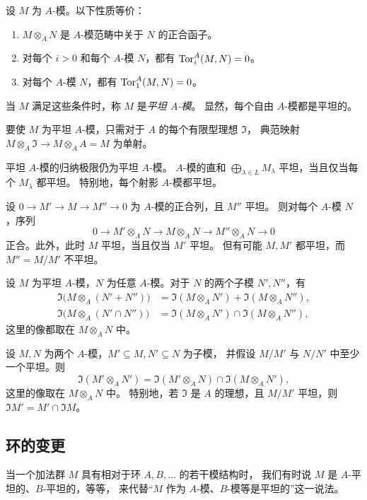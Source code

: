 设 $M$ 为 $A$-模。以下性质等价：
\begin{enumerate}[label=\alph*)]
\item $M\otimes_A N$ 是 $A$-模范畴中关于 $N$ 的正合函子。
\item 对每个 $i>0$ 和每个 $A$-模 $N$，都有 $\operatorname{Tor}_i^A(M,N)=0$。
\item 对每个 $A$-模 $N$，都有 $\operatorname{Tor}_1^A(M,N)=0$。
\end{enumerate}
当 $M$ 满足这些条件时，称 $M$ 是\emph{平坦 $A$-模}。
显然，每个自由 $A$-模都是平坦的。

要使 $M$ 为平坦 $A$-模，只需对于 $A$ 的每个有限型理想 $\mathfrak I$，
典范映射 $M\otimes_A\mathfrak I\to M\otimes_A A=M$ 为单射。

平坦 $A$-模的归纳极限仍为平坦 $A$-模。
$A$-模的直和 $\bigoplus_{\lambda\in L}M_\lambda$ 平坦，当且仅当每个 $M_\lambda$ 都平坦。
特别地，每个射影 $A$-模都平坦。

设 $0\to M'\to M\to M''\to0$ 为 $A$-模的正合列，且 $M''$ 平坦。
则对每个 $A$-模 $N$，序列
\[
 0\longrightarrow M'\otimes_A N\longrightarrow M\otimes_A N
 \longrightarrow M''\otimes_A N\longrightarrow0
\]
正合。此外，此时 $M$ 平坦，当且仅当 $M'$ 平坦。
但有可能 $M,M'$ 都平坦，而 $M''=M/M'$ 不平坦。

设 $M$ 为平坦 $A$-模，$N$ 为任意 $A$-模。对于 $N$ 的两个子模 $N',N''$，有
\[
 \begin{aligned}
 \Im\bigl(M\otimes_A(N'+N'')\bigr)
 &=\Im(M\otimes_A N')+\Im(M\otimes_A N''),\\
 \Im\bigl(M\otimes_A(N'\cap N'')\bigr)
 &=\Im(M\otimes_A N')\cap\Im(M\otimes_A N''),
 \end{aligned}
\]
这里的像都取在 $M\otimes_A N$ 中。

设 $M,N$ 为两个 $A$-模，$M'\subseteq M,N'\subseteq N$ 为子模，
并假设 $M/M'$ 与 $N/N'$ 中至少一个平坦。则
\[
 \Im(M'\otimes_A N')
 =\Im(M'\otimes_A N)\cap\Im(M\otimes_A N'),
\]
这里的像取在 $M\otimes_A N$ 中。
特别地，若 $\mathfrak I$ 是 $A$ 的理想，且 $M/M'$ 平坦，则
$\mathfrak I M'=M'\cap\mathfrak I M$。

\subsection{环的变更}\hypertarget{heading:0:6.2}{}

当一个加法群 $M$ 具有相对于环 $A,B,\ldots$ 的若干模结构时，
我们有时说 $M$ 是 $A$-平坦的、$B$-平坦的，等等，
来代替“$M$ 作为 $A$-模、$B$-模等是平坦的”这一说法。

